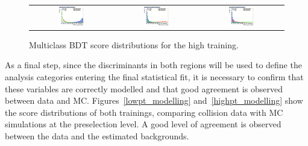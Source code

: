 \begin{figure}[htbp]
  \centering
  \setlength{\tabcolsep}{1.5pt}
  \renewcommand{\arraystretch}{0}
  \begin{tabular}{@{}c c c@{}}
    \includegraphics[width=0.33\textwidth]{images/plots_overtrain_gt200/overtrain_Signal_BDTG.png} &
    \includegraphics[width=0.33\textwidth]{images/plots_overtrain_gt200/overtrain_bkgZ_BDTG.png} &  
    \includegraphics[width=0.33\textwidth]{images/plots_overtrain_gt200/overtrain_bkgtt_BDTG.png}
  \end{tabular}
  \caption{Multiclass BDT score distributions for the high \pth training.}
  \label{highpt_scores}
\end{figure}


As a final step, since the discriminants in both \pth regions will be used to define the analysis categories entering the final statistical fit, it is necessary to confirm that these variables are correctly modelled and that good agreement is observed between data and MC. Figures~\ref{lowpt_modelling} and~\ref{highpt_modelling} show the score distributions of both trainings, comparing collision data with MC simulations at the \ttH preselection level. A good level of agreement is observed between the data and the estimated backgrounds.

